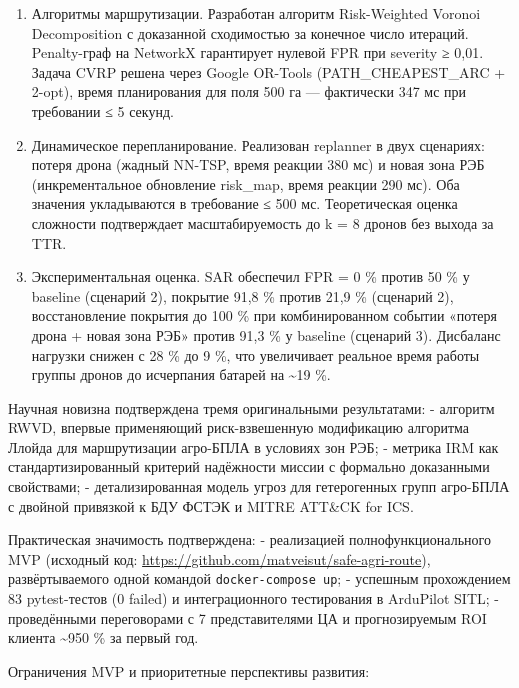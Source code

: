 \documentclass[14pt,a4paper]{extarticle}
\begin{document}
\begin{enumerate}
\item
  Алгоритмы маршрутизации. Разработан алгоритм Risk-Weighted Voronoi Decomposition с доказанной сходимостью за конечное число итераций. Penalty-граф на NetworkX гарантирует нулевой FPR при severity ≥ 0,01. Задача CVRP решена через Google OR-Tools (PATH\_CHEAPEST\_ARC + 2-opt), время планирования для поля 500 га --- фактически 347 мс при требовании ≤ 5 секунд.
\item
  Динамическое перепланирование. Реализован replanner в двух сценариях: потеря дрона (жадный NN-TSP, время реакции 380 мс) и новая зона РЭБ (инкрементальное обновление risk\_map, время реакции 290 мс). Оба значения укладываются в требование ≤ 500 мс. Теоретическая оценка сложности подтверждает масштабируемость до k = 8 дронов без выхода за TTR.
\item
  Экспериментальная оценка. SAR обеспечил FPR = 0 \% против 50 \% у baseline (сценарий 2), покрытие 91,8 \% против 21,9 \% (сценарий 2), восстановление покрытия до 100 \% при комбинированном событии «потеря дрона + новая зона РЭБ» против 91,3 \% у baseline (сценарий 3). Дисбаланс нагрузки снижен с 28 \% до 9 \%, что увеличивает реальное время работы группы дронов до исчерпания батарей на \textasciitilde19 \%.
\end{enumerate}

Научная новизна подтверждена тремя оригинальными результатами: - алгоритм RWVD, впервые применяющий риск-взвешенную модификацию алгоритма Ллойда для маршрутизации агро-БПЛА в условиях зон РЭБ; - метрика IRM как стандартизированный критерий надёжности миссии с формально доказанными свойствами; - детализированная модель угроз для гетерогенных групп агро-БПЛА с двойной привязкой к БДУ ФСТЭК и MITRE ATT\&CK for ICS.

Практическая значимость подтверждена: - реализацией полнофункционального MVP (исходный код: \url{https://github.com/matveisut/safe-agri-route}), развёртываемого одной командой \texttt{docker-compose\ up}; - успешным прохождением 83 pytest-тестов (0 failed) и интеграционного тестирования в ArduPilot SITL; - проведёнными переговорами с 7 представителями ЦА и прогнозируемым ROI клиента \textasciitilde950 \% за первый год.

Ограничения MVP и приоритетные перспективы развития:
\end{document}
